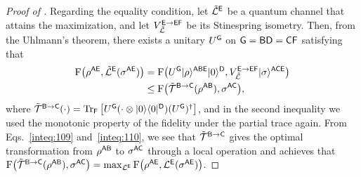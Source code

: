 \begin{proof}[Proof of ]
Regarding the equality condition, let $\til{\cL}^\sE$ be a quantum channel that attains the maximization, and let $V_{\til{\cL}}^{\sE \to \sE\sF}$ be its Stinespring isometry.
Then, from the Uhlmann's theorem, there exists a unitary $U^\sG$ on $\sG = \sB\sD = \sC\sF$ satisfying that
\begin{align}
    \rF\big(\rho^{\sA\sE}, \til{\cL}^\sE(\sigma^{\sA\sE})\big)
    &= \rF\big(U^\sG\ket{\rho}^{\sA\sB\sE}\ket{0}^\sD, V_{\til{\cL}}^{\sE\rarr\sE\sF}\ket{\sigma}^{\sA\sC\sE}\big) \\
    \label{inteq:110}
    &\leq \rF\big(\til{\cT}^{\sB\rarr\sC}(\rho^{\sA\sB}), \sigma^{\sA\sC}\big),
\end{align}
where $\til{\cT}^{\sB\rarr\sC}(\cdot) = \tr_\sF\big[U^\sG(\cdot\otimes\ketbra{0}{0}^\sD)(U^\sG)^\dag\big]$, and in the second inequality we used the monotonic property of the fidelity under the partial trace again.
From Eqs.~\eqref{inteq:109} and~\eqref{inteq:110}, we see that $\til{\cT}^{\sB\rarr\sC}$ gives the optimal transformation from $\rho^{\sA\sB}$ to $\sigma^{\sA\sC}$ through a local operation and achieves that $\rF\big(\til{\cT}^{\sB\rarr\sC}(\rho^{\sA\sB}), \sigma^{\sA\sC}\big) = \max_{\cL^{\sE}}\rF\big(\rho^{\sA\sE}, \cL^\sE(\sigma^{\sA\sE})\big)$.

\end{proof}






